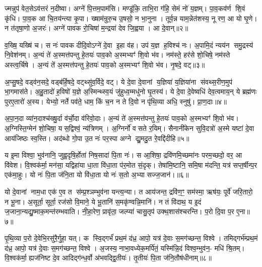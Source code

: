 ज्मन्नुप॑ वेत॒सेऽव॑त्तरं न॒दीष्वा। अग्ने॑ पि॒त्तम॒पाम॑सि। मण्डू॑कि॒ ताभि॒रा ग॑हि॒ सेमं नो॑ य॒ज्ञम्। पा॒व॒कव॑र्ण शि॒वं कृ॑धि। पा॒व॒क आ चि॒तय॑न्त्या कृ॒पा। ख्षाम॑न्रुरु॒च उ॒षसो॒ न भा॒नुना। तूर्व॒न्न याम॒न्नेत॑शस्य॒ नू रण॒ आ यो घृ॒णे। न त॑तृषा॒णो अ॒जरः॑। अग्ने॑ पावक रो॒चिषा॑ म॒न्द्रया॑ देव जि॒ह्वया। आ दे॒वान्॥२॥

व॒ख्षि॒ यख्षि॑ च। स नः॑ पावक दीदि॒वोऽग्ने॑ दे॒वा इ॒हा व॑ह। उप॑ य॒ज्ञ ह॒विश्च॑ नः। अ॒पामि॒दं न्यय॑न समु॒द्रस्य॑ नि॒वेश॑नम्। अ॒न्यं ते॑ अ॒स्मत्त॑पन्तु हे॒तयः॑ पाव॒को अ॒स्मभ्यꣳ॑ शि॒वो भ॑व। नम॑स्ते॒ हर॑से शो॒चिषे॒ नम॑स्ते अस्त्व॒र्चिषे। अ॒न्यं ते॑ अ॒स्मत्त॑पन्तु हे॒तयः॑ पाव॒को अ॒स्मभ्यꣳ॑ शि॒वो भ॑व। नृ॒षदे॒ वट्॥३॥

अ॒प्सु॒षदे॒ वड्व॑न॒सदे॒ वड्ब॑र्\mbox{}हि॒षदे॒ वट्थ्सु॑व॒र्विदे॒ वट्। ये दे॒वा दे॒वानां य॒ज्ञिया॑ य॒ज्ञिया॑ना संवथ्स॒रीण॒मुप॑ भा॒गमास॑ते। अ॒हु॒तादो॑ ह॒विषो॑ य॒ज्ञे अ॒स्मिन्थ्स्व॒यं जु॑हुध्व॒म्मधु॑नो घृ॒तस्य॑। ये दे॒वा दे॒वेष्वधि॑ देव॒त्वमाय॒न् ये ब्रह्म॑णः पुरए॒तारो॑ अ॒स्य। येभ्यो॒ नर्ते पव॑ते॒ धाम॒ किं च॒न न ते दि॒वो न पृ॑थि॒व्या अधि॒ स्नुषु॑। प्रा॒ण॒दाः॥४॥

अ॒पा॒न॒दा व्या॑न॒दाश्च॑ख्षु॒र्दा व॑र्चो॒दा व॑रिवो॒दाः। अ॒न्यं ते॑ अ॒स्मत्त॑पन्तु हे॒तयः॑ पाव॒को अ॒स्मभ्यꣳ॑ शि॒वो भ॑व। अ॒ग्निस्ति॒ग्मेन॑ शो॒चिषा॒ यस॒द्विश्वं॒ न्य॑त्रिणम्। अ॒ग्निर्नो॑ वसते र॒यिम्। सैनानी॑केन सुवि॒दत्रो॑ अ॒स्मे यष्टा॑ दे॒वा आय॑जिष्ठः स्व॒स्ति। अद॑ब्धो गो॒पा उ॒त नः॑ पर॒स्पा अग्ने द्यु॒मदु॒त रे॒वद्दि॑दीहि॥५॥

{\anuvakamend[{उप॑ दे॒वान् वट्प्रा॑ण॒दाश्चतु॑श्चत्वारिशच्च॥१॥}]}

य इ॒मा विश्वा॒ भुव॑नानि॒ जुह्व॒दृषि॒र्\mbox{}होता॑ निष॒सादा॑ पि॒ता नः॑। स आ॒शिषा॒ द्रवि॑णमि॒च्छमा॑नः परम॒च्छदो॒ वर॒ आ वि॑वेश। वि॒श्वक॑र्मा॒ मन॑सा॒ यद्विहा॑या धा॒ता वि॑धा॒ता प॑र॒मोत सं॒दृक्। तेषा॑मि॒ष्टानि॒ समि॒षा म॑दन्ति॒ यत्र॑ सप्त॒र्\mbox{}षीन्प॒र एक॑मा॒हुः। यो नः॑ पि॒ता ज॑नि॒ता यो वि॑धा॒ता यो नः॑ स॒तो अ॒भ्या सज्ज॒जान॑।॥६॥

यो दे॒वानां नाम॒धा एक॑ ए॒व त स॑म्प्र॒श्ञम्भुव॑ना यन्त्य॒न्या। त आय॑जन्त॒ द्रवि॑ण॒ꣳ॒ सम॑स्मा॒ ऋष॑यः॒ पूर्वे॑ जरि॒तारो॒ न भू॒ना। अ॒सूर्ता॒ सूर्ता॒ रज॑सो वि॒माने॒ ये भू॒तानि॑ स॒मकृ॑ण्वन्नि॒मानि॑। न तं वि॑दाथ॒ य इ॒दं ज॒जाना॒न्यद्यु॒ष्माक॒मन्त॑रम्भवाति। नी॒हा॒रेण॒ प्रावृ॑ता॒ जल्प्या॑ चासु॒तृप॑ उक्थ॒शास॑श्चरन्ति। प॒रो दि॒वा प॒र ए॒ना॥७॥

पृ॒थि॒व्या प॒रो दे॒वेभि॒रसु॑रै॒र्गुहा॒ यत्। क स्वि॒द्गर्भं॑ प्रथ॒मं द॑ध्र॒ आपो॒ यत्र॑ दे॒वाः स॒मग॑च्छन्त॒ विश्वे। तमिद्गर्भ॑म्प्रथ॒मं द॑ध्र॒ आपो॒ यत्र॑ दे॒वाः स॒मग॑च्छन्त॒ विश्वे। अ॒जस्य॒ नाभा॒वध्येक॒मर्पि॑तं॒ यस्मि॑न्नि॒दं विश्व॒म्भुव॑न॒- मधि॑ श्रि॒तम्। वि॒श्वक॑र्मा॒ ह्यज॑निष्ट दे॒व आदिद्ग॑न्ध॒र्वो अ॑भवद्द्वि॒तीयः॑। तृ॒तीयः॑ पि॒ता ज॑नि॒तौष॑धीनाम्॥८॥

